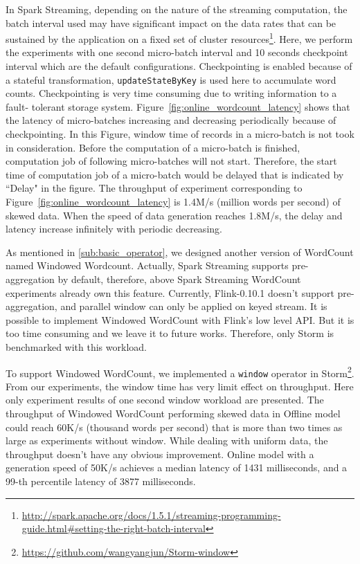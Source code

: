 In Spark Streaming, depending on the nature of the streaming computation, the batch interval used may have significant impact on the data rates that can be sustained by the application on a fixed set of cluster resources\footnote{\url{http://spark.apache.org/docs/1.5.1/streaming-programming-guide.html\#setting-the-right-batch-interval}}. Here, we perform the experiments with one second micro-batch interval and 10 seconds checkpoint interval which are the default configurations. Checkpointing is enabled because of a stateful transformation, \texttt{updateStateByKey} is used here to accumulate word counts.  Checkpointing is very time consuming due to writing information to a fault- tolerant storage system. Figure~\ref{fig:online_wordcount_latency} shows that the latency of micro-batches increasing and decreasing periodically because of checkpointing. In this Figure, window time of records in a micro-batch is not took in consideration. Before the computation of a micro-batch is finished, computation job of following micro-batches will not start. Therefore, the start time of computation job of a micro-batch would be delayed that is indicated by ``Delay" in the figure. The throughput of experiment corresponding to Figure~\ref{fig:online_wordcount_latency} is 1.4M/s (million words per second) of skewed data. When the speed of data generation reaches 1.8M/s, the delay and latency increase infinitely with periodic decreasing.

As mentioned in \cref{sub:basic_operator}, we designed another version of WordCount named Windowed Wordcount. Actually, Spark Streaming supports pre-aggregation by default, therefore, above Spark Streaming WordCount experiments already own this feature. Currently, Flink-0.10.1 doesn't support pre-aggregation, and parallel window can only be applied on keyed stream. It is possible to implement Windowed WordCount with Flink's low level API. But it is too time consuming and we leave it to future works. Therefore, only Storm is benchmarked with this workload.


To support Windowed WordCount, we implemented a \texttt{window} operator in Storm\footnote{\url{https://github.com/wangyangjun/Storm-window}}. From our experiments, the window time has very limit effect on throughput. Here only experiment results of one second window workload are presented. The throughput of Windowed WordCount performing skewed data in Offline model could reach 60K/s (thousand words per second) that is more than two times as large as experiments without window. While dealing with uniform data, the throughput doesn't have any obvious improvement. Online model with a generation speed of 50K/s achieves a median latency of 1431 milliseconds, and a 99-th percentile latency of 3877 milliseconds.

